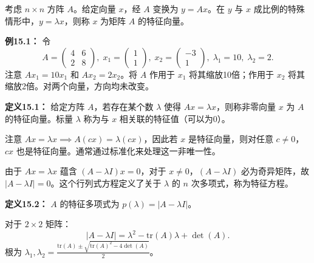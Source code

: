 \begin{translation}
考虑 $n \times n$ 方阵 $A$。给定向量 $x$，经 $A$ 变换为 $y = Ax$。在 $y$ 与 $x$ 成比例的特殊情形中，$y = \lambda x$，则称 $x$ 为矩阵 $A$ 的特征向量。

\textbf{例15.1：} 令
\[
A = \begin{pmatrix} 4 & 6 \\ 2 & 8 \end{pmatrix},\; x_1 = \begin{pmatrix} 1 \\ 1 \end{pmatrix},\; x_2 = \begin{pmatrix} -3 \\ 1 \end{pmatrix},\; \lambda_1 = 10,\; \lambda_2 = 2.
\]
注意 $Ax_1 = 10x_1$ 和 $Ax_2 = 2x_2$。将 $A$ 作用于 $x_1$ 将其缩放10倍；作用于 $x_2$ 将其缩放2倍。对两个向量，方向均未改变。

\textbf{定义15.1：} 给定方阵 $A$，若存在某个数 $\lambda$ 使得 $Ax = \lambda x$，则称非零向量 $x$ 为 $A$ 的特征向量。标量 $\lambda$ 称为与 $x$ 相关联的特征值（可以为0）。

注意 $Ax = \lambda x \implies A(cx) = \lambda(cx)$，因此若 $x$ 是特征向量，则对任意 $c \neq 0$，$cx$ 也是特征向量。通常通过标准化来处理这一非唯一性。

由于 $Ax = \lambda x$ 蕴含 $(A - \lambda I)x = 0$，对于 $x \neq 0$，$(A - \lambda I)$ 必为奇异矩阵，故 $|A - \lambda I| = 0$。这个行列式方程定义了关于 $\lambda$ 的 $n$ 次多项式，称为特征方程。

\textbf{定义15.2：} $A$ 的特征多项式为 $p(\lambda) = |A - \lambda I|$。

对于 $2 \times 2$ 矩阵：
\[
|A - \lambda I| = \lambda^2 - \text{tr}(A)\lambda + \det(A). \tag{15.1}
\]
根为 $\lambda_1, \lambda_2 = \frac{\text{tr}(A) \pm \sqrt{\text{tr}(A)^2 - 4\det(A)}}{2}$。
\end{translation}

